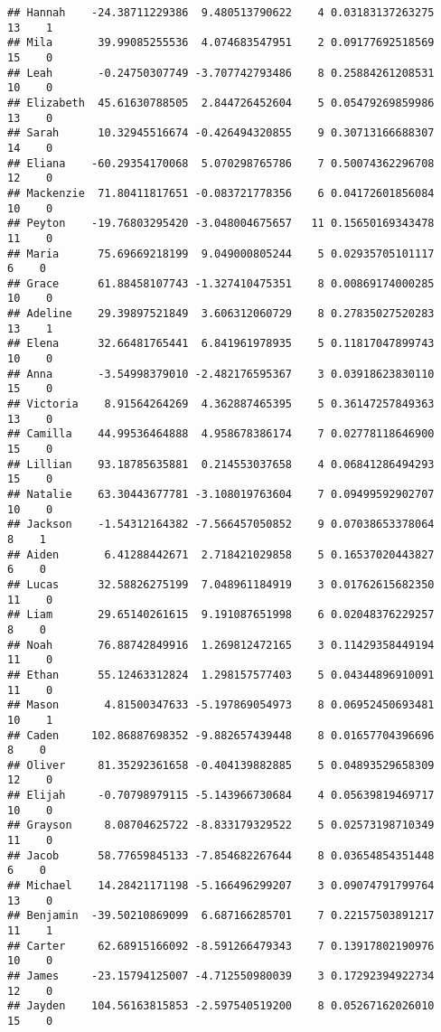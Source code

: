 \documentclass[
]{article}
\begin{document}
\begin{verbatim}
## Hannah    -24.38711229386  9.480513790622    4 0.03183137263275   13    1
## Mila       39.99085255536  4.074683547951    2 0.09177692518569   15    0
## Leah       -0.24750307749 -3.707742793486    8 0.25884261208531   10    0
## Elizabeth  45.61630788505  2.844726452604    5 0.05479269859986   13    0
## Sarah      10.32945516674 -0.426494320855    9 0.30713166688307   14    0
## Eliana    -60.29354170068  5.070298765786    7 0.50074362296708   12    0
## Mackenzie  71.80411817651 -0.083721778356    6 0.04172601856084   10    0
## Peyton    -19.76803295420 -3.048004675657   11 0.15650169343478   11    0
## Maria      75.69669218199  9.049000805244    5 0.02935705101117    6    0
## Grace      61.88458107743 -1.327410475351    8 0.00869174000285   10    0
## Adeline    29.39897521849  3.606312060729    8 0.27835027520283   13    1
## Elena      32.66481765441  6.841961978935    5 0.11817047899743   10    0
## Anna       -3.54998379010 -2.482176595367    3 0.03918623830110   15    0
## Victoria    8.91564264269  4.362887465395    5 0.36147257849363   13    0
## Camilla    44.99536464888  4.958678386174    7 0.02778118646900   15    0
## Lillian    93.18785635881  0.214553037658    4 0.06841286494293   15    0
## Natalie    63.30443677781 -3.108019763604    7 0.09499592902707   10    0
## Jackson    -1.54312164382 -7.566457050852    9 0.07038653378064    8    1
## Aiden       6.41288442671  2.718421029858    5 0.16537020443827    6    0
## Lucas      32.58826275199  7.048961184919    3 0.01762615682350   11    0
## Liam       29.65140261615  9.191087651998    6 0.02048376229257    8    0
## Noah       76.88742849916  1.269812472165    3 0.11429358449194   11    0
## Ethan      55.12463312824  1.298157577403    5 0.04344896910091   11    0
## Mason       4.81500347633 -5.197869054973    8 0.06952450693481   10    1
## Caden     102.86887698352 -9.882657439448    8 0.01657704396696    8    0
## Oliver     81.35292361658 -0.404139882885    5 0.04893529658309   12    0
## Elijah     -0.70798979115 -5.143966730684    4 0.05639819469717   10    0
## Grayson     8.08704625722 -8.833179329522    5 0.02573198710349   11    0
## Jacob      58.77659845133 -7.854682267644    8 0.03654854351448    6    0
## Michael    14.28421171198 -5.166496299207    3 0.09074791799764   13    0
## Benjamin  -39.50210869099  6.687166285701    7 0.22157503891217   11    1
## Carter     62.68915166092 -8.591266479343    7 0.13917802190976   10    0
## James     -23.15794125007 -4.712550980039    3 0.17292394922734   12    0
## Jayden    104.56163815853 -2.597540519200    8 0.05267162026010   15    0

\end{verbatim}
\end{document}

